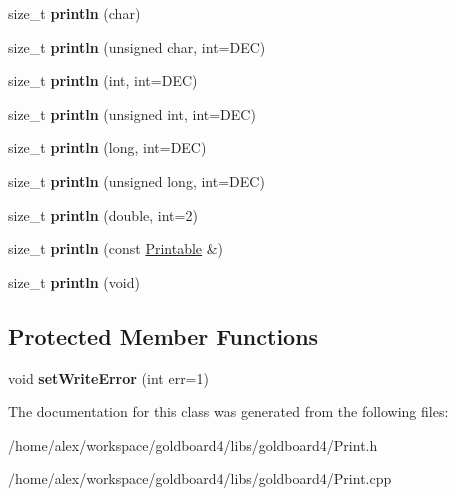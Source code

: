 \begin{DoxyCompactItemize}
\item 
size\+\_\+t {\bfseries println} (char)\hypertarget{class_print_a554896a71162f967b5794401239d7a01}{}\label{class_print_a554896a71162f967b5794401239d7a01}

\item 
size\+\_\+t {\bfseries println} (unsigned char, int=D\+EC)\hypertarget{class_print_ac9afe80f50f0118d735295aec7727e50}{}\label{class_print_ac9afe80f50f0118d735295aec7727e50}

\item 
size\+\_\+t {\bfseries println} (int, int=D\+EC)\hypertarget{class_print_a738c88471cfb8eac7c8a804699971413}{}\label{class_print_a738c88471cfb8eac7c8a804699971413}

\item 
size\+\_\+t {\bfseries println} (unsigned int, int=D\+EC)\hypertarget{class_print_ac87eed1fcb78641169ba2244278c899e}{}\label{class_print_ac87eed1fcb78641169ba2244278c899e}

\item 
size\+\_\+t {\bfseries println} (long, int=D\+EC)\hypertarget{class_print_a833fbec3ceba92e3ec95f51e026e4569}{}\label{class_print_a833fbec3ceba92e3ec95f51e026e4569}

\item 
size\+\_\+t {\bfseries println} (unsigned long, int=D\+EC)\hypertarget{class_print_aebee3c33ee5d8f10b6f378d5273742d0}{}\label{class_print_aebee3c33ee5d8f10b6f378d5273742d0}

\item 
size\+\_\+t {\bfseries println} (double, int=2)\hypertarget{class_print_a56e976b079361b6021ef7c2bedb397a2}{}\label{class_print_a56e976b079361b6021ef7c2bedb397a2}

\item 
size\+\_\+t {\bfseries println} (const \hyperlink{class_printable}{Printable} \&)\hypertarget{class_print_a20f9e104153b62e720c9b4c348b44f00}{}\label{class_print_a20f9e104153b62e720c9b4c348b44f00}

\item 
size\+\_\+t {\bfseries println} (void)\hypertarget{class_print_a169b128f9e22f0c15883768f580541a2}{}\label{class_print_a169b128f9e22f0c15883768f580541a2}

\end{DoxyCompactItemize}
\subsection*{Protected Member Functions}
\begin{DoxyCompactItemize}
\item 
void {\bfseries set\+Write\+Error} (int err=1)\hypertarget{class_print_a46656410e23c0ec14d7a01b38b3b6f00}{}\label{class_print_a46656410e23c0ec14d7a01b38b3b6f00}

\end{DoxyCompactItemize}


The documentation for this class was generated from the following files\+:\begin{DoxyCompactItemize}
\item 
/home/alex/workspace/goldboard4/libs/goldboard4/Print.\+h\item 
/home/alex/workspace/goldboard4/libs/goldboard4/Print.\+cpp\end{DoxyCompactItemize}
